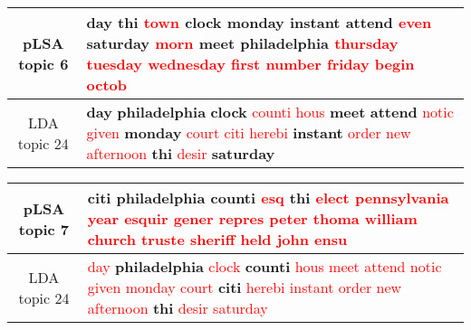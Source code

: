 \begin{center}\begin{tabularx}{\textwidth} {
  | c | >{\raggedright\arraybackslash}X | } \hline 
pLSA topic 6 & \textbf{day} \textbf{thi} \textcolor{red}{town} \textbf{clock} \textbf{monday} \textbf{instant} \textbf{attend} \textcolor{red}{even} \textbf{saturday} \textcolor{red}{morn} \textbf{meet} \textbf{philadelphia} \textcolor{red}{thursday} \textcolor{red}{tuesday} \textcolor{red}{wednesday} \textcolor{red}{first} \textcolor{red}{number} \textcolor{red}{friday} \textcolor{red}{begin} \textcolor{red}{octob} \\ \hline 
LDA topic 24 & \textbf{day} \textbf{philadelphia} \textbf{clock} \textcolor{red}{counti} \textcolor{red}{hous} \textbf{meet} \textbf{attend} \textcolor{red}{notic} \textcolor{red}{given} \textbf{monday} \textcolor{red}{court} \textcolor{red}{citi} \textcolor{red}{herebi} \textbf{instant} \textcolor{red}{order} \textcolor{red}{new} \textcolor{red}{afternoon} \textbf{thi} \textcolor{red}{desir} \textbf{saturday} \\ \hline 
\end{tabularx}

\end{center}

\begin{center}\begin{tabularx}{\textwidth} {
  | c | >{\raggedright\arraybackslash}X | } \hline 
pLSA topic 7 & \textbf{citi} \textbf{philadelphia} \textbf{counti} \textcolor{red}{esq} \textbf{thi} \textcolor{red}{elect} \textcolor{red}{pennsylvania} \textcolor{red}{year} \textcolor{red}{esquir} \textcolor{red}{gener} \textcolor{red}{repres} \textcolor{red}{peter} \textcolor{red}{thoma} \textcolor{red}{william} \textcolor{red}{church} \textcolor{red}{truste} \textcolor{red}{sheriff} \textcolor{red}{held} \textcolor{red}{john} \textcolor{red}{ensu} \\ \hline 
LDA topic 24 & \textcolor{red}{day} \textbf{philadelphia} \textcolor{red}{clock} \textbf{counti} \textcolor{red}{hous} \textcolor{red}{meet} \textcolor{red}{attend} \textcolor{red}{notic} \textcolor{red}{given} \textcolor{red}{monday} \textcolor{red}{court} \textbf{citi} \textcolor{red}{herebi} \textcolor{red}{instant} \textcolor{red}{order} \textcolor{red}{new} \textcolor{red}{afternoon} \textbf{thi} \textcolor{red}{desir} \textcolor{red}{saturday} \\ \hline 
\end{tabularx}

\end{center}

